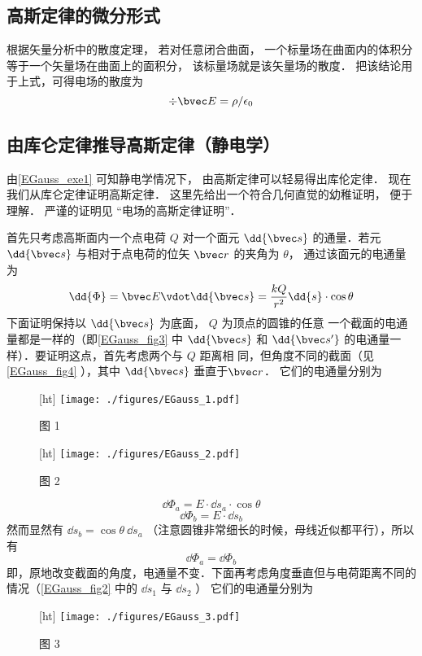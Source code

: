 \subsection{高斯定律的微分形式}

根据矢量分析中的散度定理， 若对任意闭合曲面， 一个标量场在曲面内的体积分等于一个矢量场在曲面上的面积分， 该标量场就是该矢量场的散度． 把该结论用于上式，可得电场的散度为
\begin{equation}
\div \bvec E = \rho / \epsilon_0
\end{equation}

\subsection{由库仑定律推导高斯定律（静电学）}
由\autoref{EGauss_exe1} 可知静电学情况下， 由高斯定律可以轻易得出库伦定律． 现在我们从库仑定律证明高斯定律． 这里先给出一个符合几何直觉的幼稚证明， 便于理解． 严谨的证明见 “电场的高斯定律证明”．

首先只考虑高斯面内一个点电荷 $Q$ 对一个面元 $\dd{\bvec s}$ 的通量．若元 $\dd{\bvec s}$ 与相对于点电荷的位矢 $\bvec r$ 的夹角为 $\theta$， 通过该面元的电通量为
\begin{equation}
\dd{\Phi} = \bvec E \vdot \dd{\bvec s} = \frac{kQ}{r^2} \dd{s} \cdot \cos \theta 
\end{equation} 
下面证明保持以 $\dd{\bvec s}$ 为底面， $Q$ 为顶点的圆锥的任意
一个截面的电通量都是一样的（即\autoref{EGauss_fig3} 中 $\dd{\bvec s}$ 和 $\dd{\bvec s'}$ 的电通量一样）．要证明这点，首先考虑两个与 $Q$ 距离相
同，但角度不同的截面（见\autoref{EGauss_fig4} ），其中 $\dd{\bvec s}$ 垂直于$\bvec r$． 它们的电通量分别为
\begin{figure}\label{EGauss_fig3}[ht]
\centering
\texttt{[image: ./figures/EGauss\_1.pdf]}
\caption{图 1}
\end{figure}
\begin{figure}\label{EGauss_fig4}[ht]
\centering
\texttt{[image: ./figures/EGauss\_2.pdf]}
\caption{图 2}
\end{figure}

\begin{equation}
\dd{\Phi_a} = E \cdot \dd{s_a} \cdot \cos \theta 
\end{equation} 
\begin{equation}
\dd{\Phi_b} = E \cdot \dd{s_b}
\end{equation}
然而显然有 $\dd{s_b} = \cos\theta \ \dd{s_a} $ （注意圆锥非常细长的时候，母线近似都平行），所以有
\begin{equation}
\dd{\Phi_a} = \dd{\Phi_b}
\end{equation} 
即，原地改变截面的角度，电通量不变．下面再考虑角度垂直但与电荷距离不同的情况（\autoref{EGauss_fig2} 中的 $\dd{s_1}$ 与 $\dd{s_2}$ ） 它们的电通量分别为
\begin{figure}\label{EGauss_fig2}[ht]
\centering
\texttt{[image: ./figures/EGauss\_3.pdf]}
\caption{图 3}
\end{figure}

